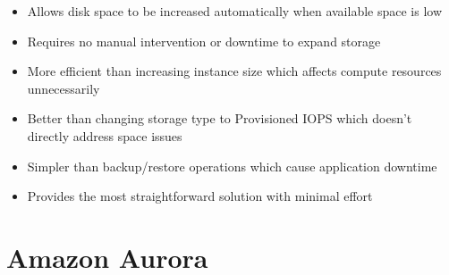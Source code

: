\documentclass[11pt,a4paper]{report}
\begin{document}
\begin{itemize}
\begin{itemize}
\begin{itemize}
\end{itemize}
  \item Allows disk space to be increased automatically when available space is low
  \item Requires no manual intervention or downtime to expand storage
  \item More efficient than increasing instance size which affects compute resources unnecessarily
  \item Better than changing storage type to Provisioned IOPS which doesn't directly address space issues
  \item Simpler than backup/restore operations which cause application downtime
  \item Provides the most straightforward solution with minimal effort
\end{itemize}
\end{itemize}

\section{Amazon Aurora}
\end{document}

